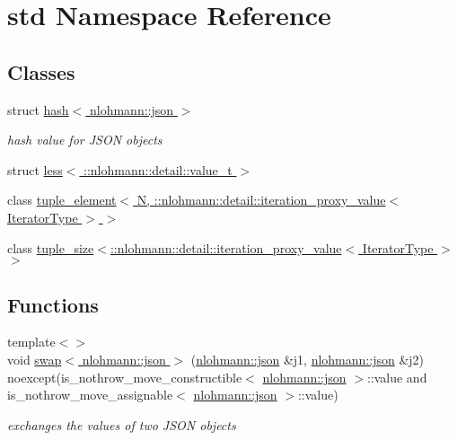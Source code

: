 \hypertarget{namespacestd}{}\section{std Namespace Reference}
\label{namespacestd}
\subsection*{Classes}
\begin{DoxyCompactItemize}
\item 
struct \hyperlink{structstd_1_1hash_3_01nlohmann_1_1json_01_4}{hash$<$ nlohmann\+::json $>$}
\begin{DoxyCompactList}\small\item\em hash value for J\+S\+ON objects \end{DoxyCompactList}\item 
struct \hyperlink{structstd_1_1less_3_01_1_1nlohmann_1_1detail_1_1value__t_01_4}{less$<$ \+::nlohmann\+::detail\+::value\+\_\+t $>$}
\item 
class \hyperlink{classstd_1_1tuple__element_3_01_n_00_01_1_1nlohmann_1_1detail_1_1iteration__proxy__value_3_01_iterator_type_01_4_01_4}{tuple\+\_\+element$<$ N, \+::nlohmann\+::detail\+::iteration\+\_\+proxy\+\_\+value$<$ Iterator\+Type $>$ $>$}
\item 
class \hyperlink{classstd_1_1tuple__size_3_1_1nlohmann_1_1detail_1_1iteration__proxy__value_3_01_iterator_type_01_4_01_4}{tuple\+\_\+size$<$\+::nlohmann\+::detail\+::iteration\+\_\+proxy\+\_\+value$<$ Iterator\+Type $>$ $>$}
\end{DoxyCompactItemize}
\subsection*{Functions}
\begin{DoxyCompactItemize}
\item 
{\footnotesize template$<$$>$ }\\void \hyperlink{namespacestd_ace192546038d61d9c28ddfe0c3d732de}{swap$<$ nlohmann\+::json $>$} (\hyperlink{namespacenlohmann_a2bfd99e845a2e5cd90aeaf1b1431f474}{nlohmann\+::json} \&j1, \hyperlink{namespacenlohmann_a2bfd99e845a2e5cd90aeaf1b1431f474}{nlohmann\+::json} \&j2) noexcept(is\+\_\+nothrow\+\_\+move\+\_\+constructible$<$ \hyperlink{namespacenlohmann_a2bfd99e845a2e5cd90aeaf1b1431f474}{nlohmann\+::json} $>$\+::value and is\+\_\+nothrow\+\_\+move\+\_\+assignable$<$ \hyperlink{namespacenlohmann_a2bfd99e845a2e5cd90aeaf1b1431f474}{nlohmann\+::json} $>$\+::value)
\begin{DoxyCompactList}\small\item\em exchanges the values of two J\+S\+ON objects \end{DoxyCompactList}\end{DoxyCompactItemize}


